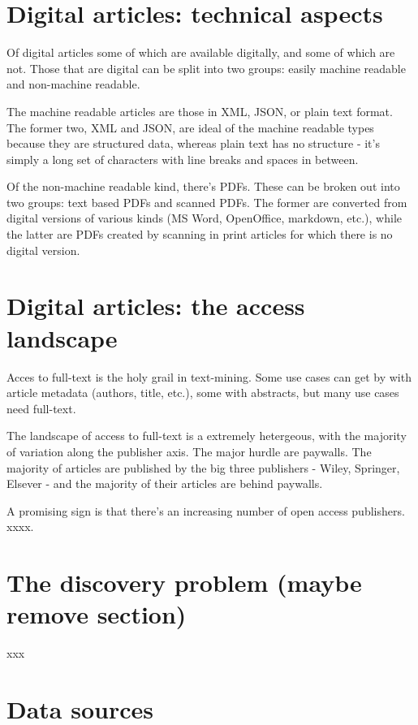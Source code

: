 \documentclass[author-year, review, 11pt]{components/elsarticle} %
\begin{document}
\section{Digital articles: technical
aspects}\label{digital-articles-technical-aspects}

Of digital articles some of which are available digitally, and some of
which are not. Those that are digital can be split into two groups:
easily machine readable and non-machine readable.

The machine readable articles are those in XML, JSON, or plain text
format. The former two, XML and JSON, are ideal of the machine readable
types because they are structured data, whereas plain text has no
structure - it's simply a long set of characters with line breaks and
spaces in between.

Of the non-machine readable kind, there's PDFs. These can be broken out
into two groups: text based PDFs and scanned PDFs. The former are
converted from digital versions of various kinds (MS Word, OpenOffice,
markdown, etc.), while the latter are PDFs created by scanning in print
articles for which there is no digital version.

\section{Digital articles: the access
landscape}\label{digital-articles-the-access-landscape}

Acces to full-text is the holy grail in text-mining. Some use cases can
get by with article metadata (authors, title, etc.), some with
abstracts, but many use cases need full-text.

The landscape of access to full-text is a extremely hetergeous, with the
majority of variation along the publisher axis. The major hurdle are
paywalls. The majority of articles are published by the big three
publishers - Wiley, Springer, Elsever - and the majority of their
articles are behind paywalls.

A promising sign is that there's an increasing number of open access
publishers. xxxx.

\section{The discovery problem (maybe remove
section)}\label{the-discovery-problem-maybe-remove-section}

xxx

\section{Data sources}\label{data-sources}
\end{document}
